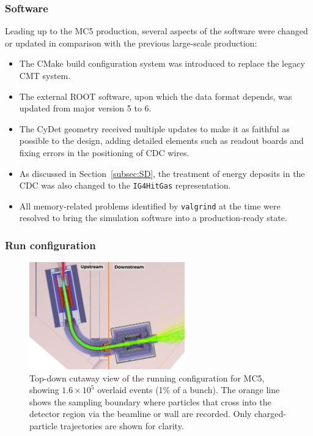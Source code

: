 \subsubsection{Software}
Leading up to the MC5 production, several aspects of the software were changed
or updated in comparison with the previous large-scale production:
\begin{itemize}
    \item The CMake build configuration system was introduced to replace the
    legacy CMT system. 
    \item The external ROOT software, upon which the \oaEvent data format
    depends, was updated from major version 5 to 6.
    \item The CyDet geometry received multiple updates to make it as faithful as
    possible to the design, adding detailed elements such as readout boards and
    fixing errors in the positioning of CDC wires. 
    \item As discussed in Section~\ref{subsec:SD}, the treatment of energy
    deposits in the CDC was also changed to the \texttt{IG4HitGas}
    representation.
    \item All memory-related problems identified by \texttt{valgrind} at the
    time were resolved to bring the simulation software into a production-ready
    state.
\end{itemize}

\subsubsection{Run configuration}

\begin{figure}
    \centering
    \includegraphics[width=0.6\textwidth]{chapter3/sampling_plane_illu_ink.pdf}
    \caption{
        Top-down cutaway view of the running configuration for MC5,
        showing $1.6\times 10^5$ overlaid events (1\% of a bunch). The orange
        line shows the sampling boundary where particles that cross into the
        detector region via the beamline or wall are recorded. Only
        charged-particle trajectories are shown for clarity.
    }
    \label{fig:Phase-I Sampling World}
\end{figure}



